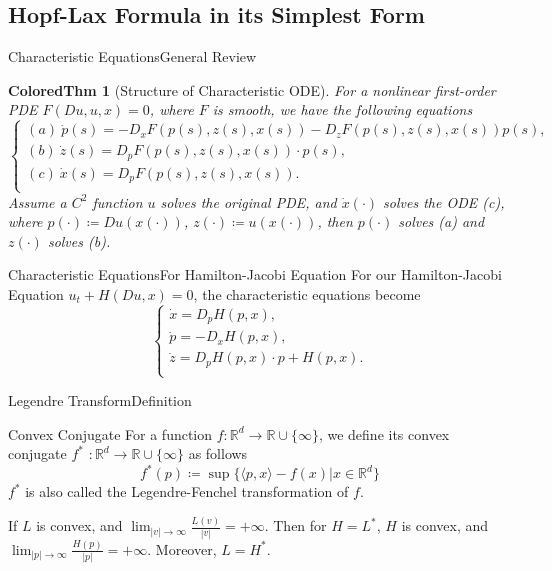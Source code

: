 \documentclass[english]{pkuslide}
\newtheorem{ColoredThm}{ColoredThm}
\begin{document}
\subsection{Hopf-Lax Formula in its Simplest Form}
\begin{frame}{Characteristic Equations}{General Review}
\begin{ColoredThm}[Structure of Characteristic ODE]
For a nonlinear first-order PDE $F(Du,u,x) = 0$, where $F$ is smooth, we have the following equations
\begin{equation}
  \left\{
   \begin{array}{l}
   (a)\ \dot{p}(s) = -D_{x}F(p(s),z(s),x(s))-D_{z}F(p(s),z(s),x(s))p(s), \\
    (b)\ \dot{z}(s) = D_{p}F(p(s),z(s),x(s))\cdot p(s), \\
    (c)\ \dot{x}(s) = D_{p}F(p(s),z(s),x(s)).  \\
   \end{array}
  \right.
\end{equation}
Assume a $C^2$ function $u$ solves the original PDE, and $\dot{x}(\cdot)$ solves the ODE (c), where $p(\cdot) \coloneqq Du(x(\cdot))$, $z(\cdot) \coloneqq u(x(\cdot))$, then $p(\cdot)$ solves (a) and $z(\cdot)$ solves (b).
\end{ColoredThm}

	\end{frame}
\begin{frame}{Characteristic Equations}{For Hamilton-Jacobi Equation}
For our Hamilton-Jacobi Equation $u_{t} + H(Du, x) = 0$, the characteristic equations become
\begin{equation}
  \left\{
   \begin{array}{l}
   \dot{x}= D_{p}H(p, x), \\
   \dot{p}= -D_{x}H(p, x), \\
\dot{z} = D_{p}H(p,x)\cdot p + H(p, x).  \\
   \end{array}
  \right.
\end{equation}
	\end{frame}
	\begin{frame}{Legendre Transform}{Definition}
\begin{exampleblock}{Convex Conjugate}
For a function \begin{math} f :  \mathbb{R}^{d} \to \mathbb{R} \cup \{ \infty \} \end{math}, we define its convex conjugate $f^{*}$ \begin{math}:\mathbb{R}^{d} \to \mathbb{R} \cup \{ \infty \} \end{math} as follows
\begin{equation}
 f^{*}(p) \coloneqq \sup \{\langle p, x\rangle -f(x) | x \in \mathbb{R}^{d} \}
\end{equation}
$f^{*}$ is also called the Legendre-Fenchel transformation of $f$.
\end{exampleblock}
If $L$ is convex, and $\lim_{|v| \to \infty}\frac{L(v)}{|v|}=+\infty$. Then for $H=L^*$, $H$ is convex, and $\lim_{|p| \to \infty}\frac{H(p)}{|p|}=+\infty$. Moreover, $L=H^*$.
	\end{frame}
\end{document}
